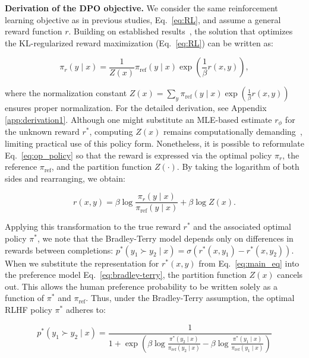 \textbf{Derivation of the DPO objective.} We consider the same reinforcement learning objective as in previous studies, Eq.~\ref{eq:RL}, and assume a general reward function $r$. Building on established results~\citep{peters2007reinforcement, peng2019advantage, korbak2022reinforcement, go2023aligning}, the solution that optimizes the KL-regularized reward maximization (Eq.~\ref{eq:RL}) can be written as:

\begin{equation}\label{eq:op_policy}
    \pi_r(y\mid x) = \frac{1}{Z(x)}\pi_\text{ref}(y\mid x)\exp\left(\frac{1}{\beta}r(x, y)\right),
\end{equation}

where the normalization constant $Z(x) =\sum_{y}\pi_\text{ref}(y\mid x)\exp\left(\frac{1}{\beta}r(x, y)\right)$ ensures proper normalization. For the detailed derivation, see Appendix \ref{app:derivation1}. Although one might substitute an MLE-based estimate $r_\phi$ for the unknown reward $r^*$, computing $Z(x)$ remains computationally demanding~\citep{korbak2022reinforcement, go2023aligning}, limiting practical use of this policy form. Nonetheless, it is possible to reformulate Eq.~\ref{eq:op_policy} so that the reward is expressed via the optimal policy $\pi_r$, the reference $\pi_\text{ref}$, and the partition function $Z(\cdot)$. By taking the logarithm of both sides and rearranging, we obtain:

\begin{equation}\label{eq:main_eq}
    r(x,y) =\beta \log \frac{\pi_r(y\mid x)}{\pi_\text{ref}(y\mid x)} + \beta \log Z(x).
\end{equation}

Applying this transformation to the true reward $r^*$ and the associated optimal policy $\pi^*$, we note that the Bradley-Terry model depends only on differences in rewards between completions: ${p^*(y_1 \succ y_2 \mid x) = \sigma(r^*(x, y_1) - r^*(x, y_2))}$. When we substitute the representation for $r^*(x,y)$ from Eq.~\ref{eq:main_eq} into the preference model Eq.~\ref{eq:bradley-terry}, the partition function $Z(x)$ cancels out. This allows the human preference probability to be written solely as a function of $\pi^*$ and $\pi_\text{ref}$. Thus, under the Bradley-Terry assumption, the optimal RLHF policy $\pi^*$ adheres to:

\begin{equation}\label{eq:objective}
    p^*(y_1\succ y_2 \mid x)=\frac{1}{1 + \exp\left(\beta \log \frac{\pi^*(y_2\mid x)}{\pi_\text{ref}(y_2\mid x)} - \beta \log \frac{\pi^*(y_1\mid x)}{\pi_\text{ref}(y_1\mid x)}\right)}
\end{equation}

